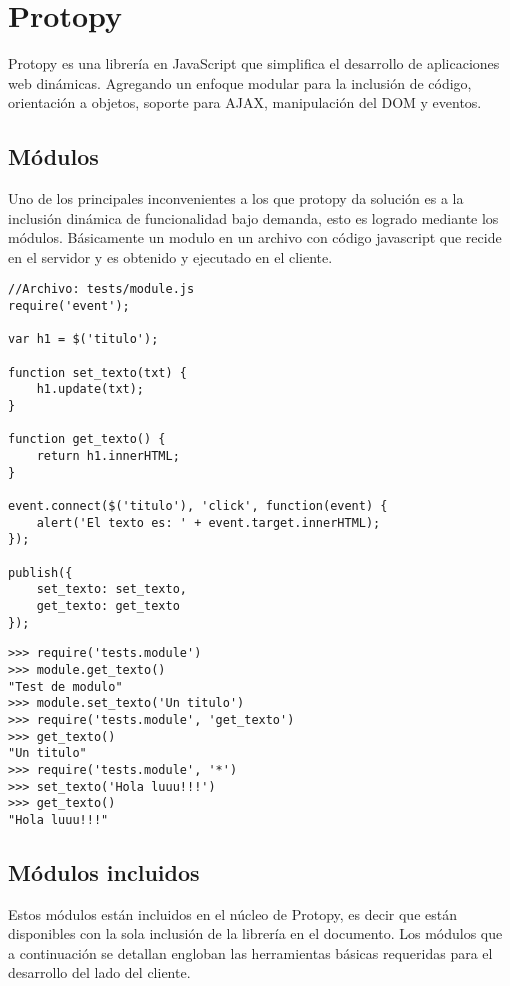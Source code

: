 
\chapter{Protopy}
\label{ch:apendiceProtopy}
Protopy es una librería en JavaScript que simplifica el desarrollo de
aplicaciones web dinámicas.
Agregando un enfoque modular para la inclusión de código, orientación a objetos,
soporte para AJAX, manipulación del DOM y eventos.

\section{Módulos}
Uno de los principales inconvenientes a los que protopy da solución es a la
inclusión dinámica de funcionalidad bajo demanda,
esto es logrado mediante los módulos.
Básicamente un modulo en un archivo con código javascript que recide en el
servidor y es obtenido y ejecutado en el cliente.

\begin{lstlisting}[style=javascript,label=estructura-modulo,caption=Estructura
de un modulo]
//Archivo: tests/module.js
require('event');

var h1 = $('titulo');

function set_texto(txt) {
    h1.update(txt);
}

function get_texto() {
    return h1.innerHTML;
}

event.connect($('titulo'), 'click', function(event) {
    alert('El texto es: ' + event.target.innerHTML);
});

publish({
    set_texto: set_texto,
    get_texto: get_texto
});
\end{lstlisting}

\begin{lstlisting}[style=consola]
>>> require('tests.module')
>>> module.get_texto()
"Test de modulo"
>>> module.set_texto('Un titulo')
>>> require('tests.module', 'get_texto')
>>> get_texto()
"Un titulo"
>>> require('tests.module', '*')
>>> set_texto('Hola luuu!!!')
>>> get_texto()
"Hola luuu!!!"
\end{lstlisting}

\section{Módulos incluidos}
Estos módulos están incluidos en el núcleo de Protopy, es decir que están
disponibles con la sola inclusión de la librería en el documento.
Los módulos que a continuación se detallan engloban las herramientas básicas
requeridas para el desarrollo del lado del cliente.
